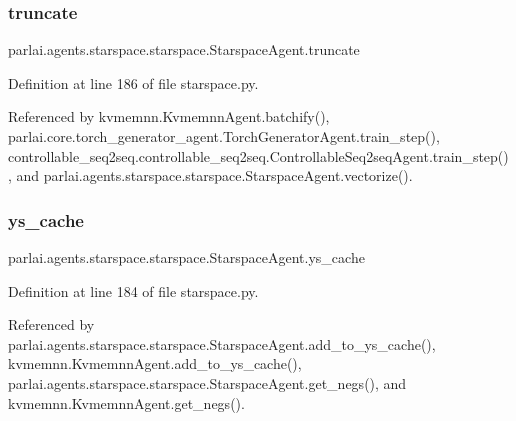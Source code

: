 \subsubsection{\texorpdfstring{truncate}{truncate}}
{\footnotesize\ttfamily parlai.\+agents.\+starspace.\+starspace.\+Starspace\+Agent.\+truncate}



Definition at line 186 of file starspace.\+py.



Referenced by kvmemnn.\+Kvmemnn\+Agent.\+batchify(), parlai.\+core.\+torch\+\_\+generator\+\_\+agent.\+Torch\+Generator\+Agent.\+train\+\_\+step(), controllable\+\_\+seq2seq.\+controllable\+\_\+seq2seq.\+Controllable\+Seq2seq\+Agent.\+train\+\_\+step(), and parlai.\+agents.\+starspace.\+starspace.\+Starspace\+Agent.\+vectorize().

\mbox{\label{classparlai_1_1agents_1_1starspace_1_1starspace_1_1StarspaceAgent_a050c7f6c495b0bccc9c29caa5c83d0ae}} 
\subsubsection{\texorpdfstring{ys\+\_\+cache}{ys\_cache}}
{\footnotesize\ttfamily parlai.\+agents.\+starspace.\+starspace.\+Starspace\+Agent.\+ys\+\_\+cache}



Definition at line 184 of file starspace.\+py.



Referenced by parlai.\+agents.\+starspace.\+starspace.\+Starspace\+Agent.\+add\+\_\+to\+\_\+ys\+\_\+cache(), kvmemnn.\+Kvmemnn\+Agent.\+add\+\_\+to\+\_\+ys\+\_\+cache(), parlai.\+agents.\+starspace.\+starspace.\+Starspace\+Agent.\+get\+\_\+negs(), and kvmemnn.\+Kvmemnn\+Agent.\+get\+\_\+negs().

\mbox{\label{classparlai_1_1agents_1_1starspace_1_1starspace_1_1StarspaceAgent_a6f300619fe9d0814ed612db691ec9dab}} 
